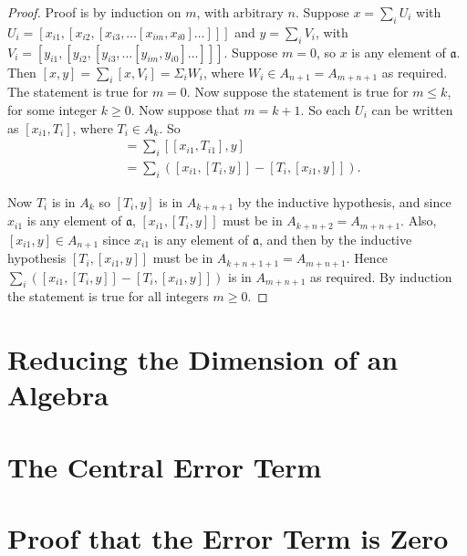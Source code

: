 \documentclass[honours]{UNSWthesis}
\newcommand{\1}{\mathbf{e}_{1}}
\newcommand{\2}{\mathbf{e}_{3}}
\newcommand{\3}{\mathbf{e}_{3}}
\begin{document}
\begin{proof}
Proof is by induction on $m$, with arbitrary $n$. Suppose $x=\sum\limits_{i} U_{i}$ with $U_{i}=[x_{i1},[x_{i2},[x_{i3},\ldots [x_{im},x_{i0}]\ldots]]]$ and $y=\sum\limits_{i} V_{i}$, with $V_{i}=[y_{i1},[y_{i2},[y_{i3},\ldots [y_{im},y_{i0}]\ldots]]]$.
\newline
Suppose $m=0$, so $x$ is any element of $\mathfrak{a}$. Then $[x,y]=\sum\limits_{i}[x,V_{i}]=\Sigma_{i}W_{i}$, where $W_{i} \in A_{n+1}=A_{m+n+1}$ as required. The statement is true for $m=0$. \newline
Now suppose the statement is true for $m \leq k$, for some integer $k \geq 0$. Now suppose that $m=k+1$. So each $U_{i}$ can be written as $[x_{i1},T_{i}]$, where $T_{i} \in A_{k}$. So
\begin{align*}
[x,y] &=\sum\limits_{i}[[x_{i1},T_{i1}],y] \\
&= \sum\limits_{i}([x_{i1},[T_{i},y]]-[T_{i},[x_{i1},y]]).
\end{align*}

Now $T_{i}$ is in $A_{k}$ so $[T_{i},y]$ is in $A_{k+n+1}$ by the inductive hypothesis, and since $x_{i1}$ is any element of $\mathfrak{a}$, $[x_{i1},[T_{i},y]]$ must be in $A_{k+n+2}=A_{m+n+1}$. \newline
Also, $[x_{i1},y] \in A_{n+1}$ since $x_{i1}$ is any element of $\mathfrak{a}$, and then by the inductive hypothesis $[T_{i},[x_{i1},y]]$ must be in $A_{k+n+1+1}=A_{m+n+1}$. \newline
Hence $\sum\limits_{i}([x_{i1},[T_{i},y]]-[T_{i},[x_{i1},y]])$ is in $A_{m+n+1}$ as required. By induction the statement is true for all integers $m \geq 0$.
\end{proof}

\section{Reducing the Dimension of an Algebra}

\section{The Central Error Term}

\section{Proof that the Error Term is Zero}

\end{document}
